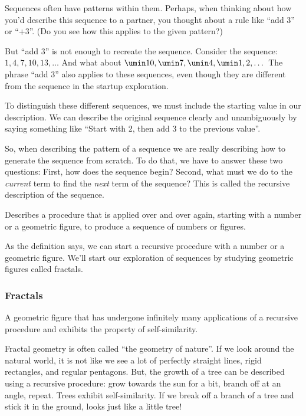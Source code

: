Sequences often have patterns within them. Perhaps, when thinking about how you'd describe this sequence to a partner, you thought about a rule like ``add 3'' or ``+3''. (Do you see how this applies to the given pattern?)

But ``add 3'' is not enough to recreate the sequence. Consider the sequence: $1, 4, 7, 10, 13, \dotsc$ And what about $\umin10, \umin7, \umin4, \umin1, 2, \dotsc$ The phrase ``add 3'' also applies to these sequences, even though they are different from the sequence in the startup exploration.

To distinguish these different sequences, we must include the starting value in our description. We can describe the original sequence clearly and unambiguously by saying something like ``Start with 2, then add 3 to the previous value''.

So, when describing the pattern of a sequence we are really describing how to generate the sequence from scratch. To do that, we have to answer these two questions: First, how does the sequence begin? Second, what must we do to the \textit{current} term to find the \textit{next} term of the sequence? This is called the \gls{recursive} description of the sequence.

\begin{boxeddef}[Recursive]
Describes a procedure that is applied over and over again, starting with a number or a geometric figure, to produce a sequence of numbers or figures.
\end{boxeddef}

As the definition says, we can start a recursive procedure with a number or a geometric figure. We'll start our exploration of sequences by studying geometric figures called \glspl{fractal}.

\subsubsection{Fractals}

\begin{boxeddef}[Fractal]
A geometric figure that has undergone infinitely many applications of a recursive procedure and exhibits the property of self-similarity.
\end{boxeddef}

Fractal geometry is often called ``the geometry of nature''. If we look around the natural world, it is not like we see a lot of perfectly straight lines, rigid rectangles, and regular pentagons. But, the growth of a tree can be described using a recursive procedure: grow towards the sun for a bit, branch off at an angle, repeat. Trees exhibit self-similarity. If we break off a branch of a tree and stick it in the ground, looks just like a little tree!

